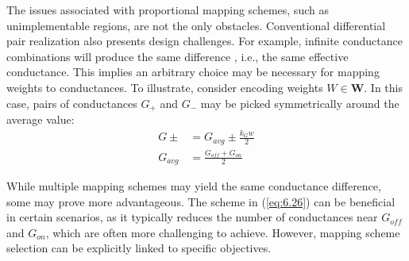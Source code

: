 \noindent The issues associated with proportional mapping schemes, such as unimplementable regions, are not the only obstacles. Conventional differential pair realization also presents design challenges. For example, infinite conductance combinations will produce the same difference \cite{kim20214k}, i.e., the same effective conductance. This implies an arbitrary choice may be necessary for mapping weights to conductances. To illustrate, consider encoding weights $W \in \mathbf{W}$. In this case, pairs of conductances $G_+$ and $G_-$ may be picked symmetrically around the average value:
\begin{align}
G\pm &= G_{avg} \pm \frac{k_G w}{2} \label{eq:6.29} \\
G_{avg} &= \frac{G_{off} + G_{on}}{2} \label{eq:6.30}
\end{align}



\noindent While multiple mapping schemes may yield the same conductance difference, some may prove more advantageous. The scheme in (\ref{eq:6.26}) can be beneficial in certain scenarios, as it typically reduces the number of conductances near $G_{off}$ and $G_{on}$, which are often more challenging to achieve. However, mapping scheme selection can be explicitly linked to specific objectives.\\



